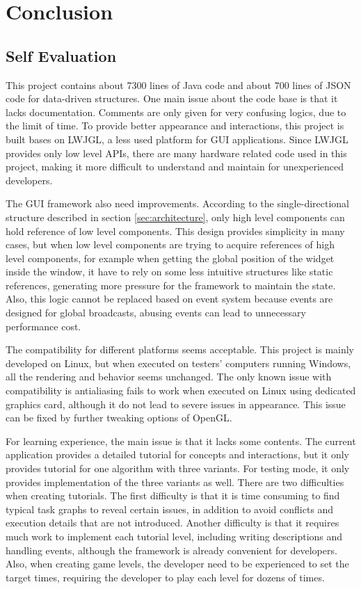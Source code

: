 \documentclass[msc,deptreport, cs]{infthesis}
\begin{document}
\chapter{Conclusion}

\section{Self Evaluation}

This project contains about 7300 lines of Java code and about 700 lines of JSON code for data-driven structures. One main issue about the code base is that it lacks documentation. Comments are only given for very confusing logics, due to the limit of time. To provide better appearance and interactions, this project is built bases on LWJGL, a less used platform for GUI applications. Since LWJGL provides only low level APIs, there are many hardware related code used in this project, making it more difficult to understand and maintain for unexperienced developers.

The GUI framework also need improvements. According to the single-directional structure described in section \ref{sec:architecture}, only high level components can hold reference of low level components. This design provides simplicity in many cases, but when low level components are trying to acquire references of high level components, for example when getting the global position of the widget inside the window, it have to rely on some less intuitive structures like static references, generating more pressure for the framework to maintain the state. Also, this logic cannot be replaced based on event system because events are designed for global broadcasts, abusing events can lead to unnecessary performance cost.

The compatibility for different platforms seems acceptable. This project is mainly developed on Linux, but when executed on testers' computers running Windows, all the rendering and behavior seems unchanged. The only known issue with compatibility is antialiasing fails to work when executed on Linux using dedicated graphics card, although it do not lead to severe issues in appearance. This issue can be fixed by further tweaking options of OpenGL. 

For learning experience, the main issue is that it lacks some contents. The current application provides a detailed tutorial for concepts and interactions, but it only provides tutorial for one algorithm with three variants. For testing mode, it only provides implementation of the three variants as well. There are two difficulties when creating tutorials. The first difficulty is that it is time consuming to find typical task graphs to reveal certain issues, in addition to avoid conflicts and execution details that are not introduced. Another difficulty is that it requires much work to implement each tutorial level, including writing descriptions and handling events, although the framework is already convenient for developers. Also, when creating game levels, the developer need to be experienced to set the target times, requiring the developer to play each level for dozens of times.
\end{document}

